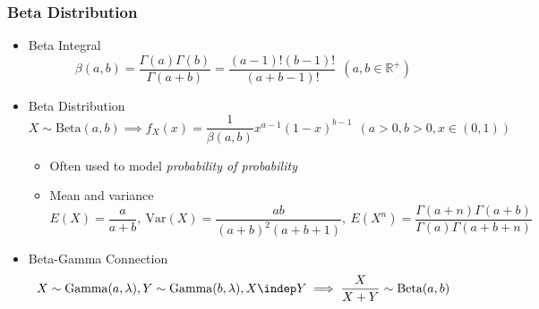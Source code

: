 \subsubsection*{Beta Distribution}
\begin{itemize}
    \item Beta Integral
    \begin{equation}
        \beta(a,b)=\frac{\Gamma(a)\Gamma(b)}{\Gamma(a+b)}=\frac{(a-1)!(b-1)!}{(a+b-1)!}~~(a,b\in\mathbb{R^+})
    \end{equation}
    \item Beta Distribution
    \begin{equation}
        X\sim\text{Beta}(a,b)\implies f_X(x)=\frac{1}{\beta(a,b)}x^{a-1}(1-x)^{b-1}~~(a>0,b>0,x\in(0,1))
    \end{equation}
    \begin{itemize}
        \item Often used to model \textit{probability of probability}
        \item Mean and variance
        \begin{equation}
            E(X)=\frac{a}{a+b},~\text{Var}(X)=\frac{ab}{(a+b)^2(a+b+1)},~E\left(X^n\right)=\frac{\Gamma(a+n)\Gamma(a+b)}{\Gamma(a)\Gamma(a+b+n)}
        \end{equation}
    \end{itemize}
    \item Beta-Gamma Connection
    \begin{equation}
        X\sim\text{Gamma}(a,\lambda),Y\sim\text{Gamma}(b,\lambda),X\indep Y\implies \frac{X}{X+Y}\sim\text{Beta}(a,b)
    \end{equation}
\end{itemize}
\begin{figures}
\end{figures}

